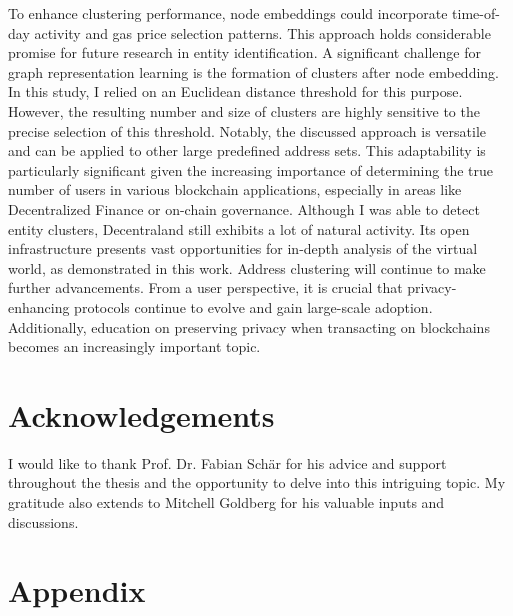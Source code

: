 \documentclass[12pt,a4paper,titlepage,oneside,english]{article}
\begin{document}
To enhance clustering performance, node embeddings could incorporate time-of-day activity and gas price selection patterns. This approach holds considerable promise for future research in entity identification. \newline
A significant challenge for graph representation learning is the formation of clusters after node embedding. In this study, I relied on an Euclidean distance threshold for this purpose. However, the resulting number and size of clusters are highly sensitive to the precise selection of this threshold. \newline
Notably, the discussed approach is versatile and can be applied to other large predefined address sets. This adaptability is particularly significant given the increasing importance of determining the true number of users in various blockchain applications, especially in areas like Decentralized Finance or on-chain governance. \newline
Although I was able to detect entity clusters, Decentraland still exhibits a lot of natural activity. Its open infrastructure presents vast opportunities for in-depth analysis of the virtual world, as demonstrated in this work. \newline
Address clustering will continue to make further advancements. From a user perspective, it is crucial that privacy-enhancing protocols continue to evolve and gain large-scale adoption. Additionally, education on preserving privacy when transacting on blockchains becomes an increasingly important topic.

\newpage
\section*{Acknowledgements}
I would like to thank Prof. Dr. Fabian Schär for his advice and support throughout the thesis and the opportunity to delve into this intriguing topic. My gratitude also extends to Mitchell Goldberg for his valuable inputs and discussions.


\newpage
\setcounter{page}{1}
\onehalfspacing
{}



\section{Appendix}
\end{document}
